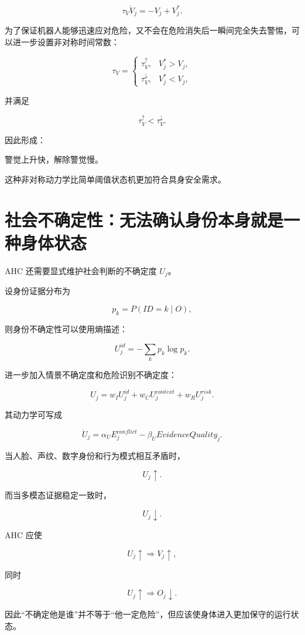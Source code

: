 \[
\boxed{
\tau_V
\dot V_j
=
-V_j
+
V_j^*.
}
\]

为了保证机器人能够迅速应对危险，又不会在危险消失后一瞬间完全失去警惕，可以进一步设置非对称时间常数：

\[
\tau_V=
\begin{cases}
\tau_V^\uparrow,
&
V_j^*>V_j,
\\
\tau_V^\downarrow,
&
V_j^*<V_j,
\end{cases}
\]

并满足

\[
\tau_V^\uparrow
<
\tau_V^\downarrow.
\]

因此形成：

\begin{statementbox}
警觉上升快，解除警觉慢。
\end{statementbox}

这种非对称动力学比简单阈值状态机更加符合具身安全需求。


\section{社会不确定性：无法确认身份本身就是一种身体状态}

AHC 还需要显式维护社会判断的不确定度 $U_j$。

设身份证据分布为

\[
p_k=P(ID=k\mid O),
\]

则身份不确定性可以使用熵描述：

\[
U_j^{id}
=
-\sum_k
p_k
\log p_k.
\]

进一步加入情景不确定度和危险识别不确定度：

\[
U_j
=
w_IU_j^{id}
+
w_CU_j^{context}
+
w_RU_j^{risk}.
\]

其动力学可写成

\[
\boxed{
\dot U_j
=
\alpha_U
E_j^{conflict}
-
\beta_U
EvidenceQuality_j.
}
\]

当人脸、声纹、数字身份和行为模式相互矛盾时，

\[
U_j\uparrow.
\]

而当多模态证据稳定一致时，

\[
U_j\downarrow.
\]

AHC 应使

\[
U_j\uparrow
\Rightarrow
V_j\uparrow,
\]

同时

\[
U_j\uparrow
\Rightarrow
O_j\downarrow.
\]

因此“不确定他是谁”并不等于“他一定危险”，但应该使身体进入更加保守的运行状态。


